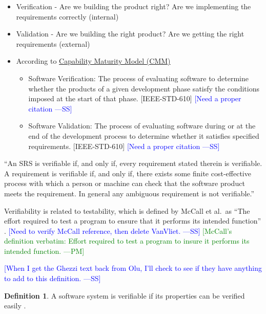 \documentclass[letterpaper, cleveref]{lipics-v2019}
\newcommand{\authornote}[3]{\textcolor{#1}{[#3 ---#2]}}
\newcommand{\authornote}[3]{}
\newcommand{\wss}[1]{\authornote{blue}{SS}{#1}} %
\newcommand{\pmi}[1]{\authornote{green}{PM}{#1}} %
\theoremstyle{definition}
\newtheorem{defn}{Definition}
\begin{document}
\begin{itemize}
	
\item Verification - Are we building the product right?  Are we implementing
the requirements correctly (internal) \item Validation - Are we building the
right product? Are we getting the right requirements (external) \item
According to  \href{https://en.wikipedia.org/wiki/Software_verification_and_validation}
{Capability Maturity Model (CMM)}

\begin{itemize}
\item Software Verification: The process of evaluating software to determine
      whether the products of a given development phase satisfy the conditions
      imposed at the start of that phase. [IEEE-STD-610] \wss{Need a proper
      citation}
\item Software Validation: The process of evaluating software during or at the
      end of the development process to determine whether it satisfies specified
      requirements. [IEEE-STD-610] \wss{Need a proper citation}
\end{itemize}

\end{itemize}
  
``An SRS is verifiable if, and only if, every requirement stated therein is
verifiable. A requirement is verifiable if, and only if, there exists some
finite cost-effective process with which a person or machine can check that the
software product meets the requirement. In general any ambiguous requirement is
not verifiable.'' \citep{IEEE1998}
  
Verifiability is related to testability, which is defined by McCall et al.\
as ``The effort required to test a program to ensure that it performs its
intended function'' \citep{VanVliet2000}. \wss{Need to verify McCall
reference, then delete VanVliet.} \pmi{McCall's definition verbatim: Effort
required to test a program to insure it performs its intended function.}
  
\wss{When I get the Ghezzi text back from Olu, I'll check to see if they have anything to add to this definition.}
  
\begin{defn}
  A software system is verifiable if its properties can be verified easily
  \citep{ghezzi1991fundamentals}.
\end{defn}
\end{document}
